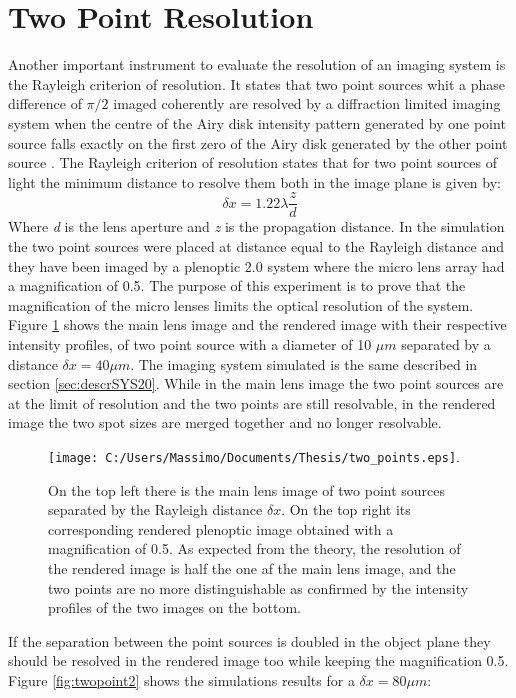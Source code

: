 \section{Two Point Resolution}
\label{sec:two}
Another important instrument to evaluate the resolution of an imaging system is the Rayleigh criterion of resolution. It states that two point sources whit a phase difference of $\pi/2$ imaged coherently  are resolved by a diffraction limited imaging system when the centre of the Airy disk intensity pattern generated by one point source falls exactly on the first zero of the Airy disk generated by the other point source \cite{goodman2005introduction}. The Rayleigh criterion of resolution states that for two point sources of light the minimum distance to resolve them both in the image plane is given  by:
\begin{equation}
	\label{eq:rayleigh}
	\delta x = 1.22\lambda\dfrac{z}{d}
\end{equation}
Where \textit{d} is the lens aperture and \textit{z} is the propagation distance.
In the simulation the two point sources were placed at distance equal to the Rayleigh distance and they have been imaged by a plenoptic 2.0 system where the micro lens array had a magnification of 0.5. The purpose of this experiment is to prove that the magnification of the micro lenses limits the optical resolution of the system. 
Figure \ref{fig:twopoint1} shows the main lens image and the rendered image with their respective intensity profiles, of two point source with a diameter of 10 $\mu m$ separated by a distance $\delta x = 40 \mu m$. The imaging system simulated is the same described in section \ref{sec:descrSYS20}.
While in the main lens image the two point sources are at the limit of resolution and the two points are still resolvable, in the rendered image the two spot sizes are merged together and no longer resolvable.
\begin{figure}[H]
	\centering
	\texttt{[image: C:/Users/Massimo/Documents/Thesis/two\_points.eps]}.
	\caption{\label{fig:twopoint1} On the top left there is the main lens image of two point sources separated by the Rayleigh distance $\delta x$. On the top right its corresponding rendered plenoptic image obtained with a magnification of 0.5. As expected from the theory, the resolution of the rendered image is half the one af the main lens image, and the two points are no more distinguishable as confirmed by the intensity profiles of the two images on the bottom.   }
\end{figure}
If the separation between the point sources is doubled in the object plane they should be resolved in the rendered image too while keeping the magnification 0.5. Figure \ref{fig:twopoint2} shows the simulations results for a $\delta x = 80 \mu m$:
